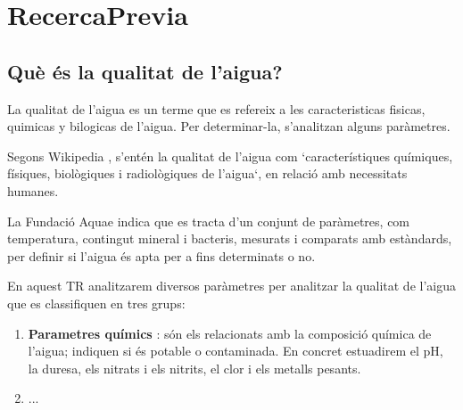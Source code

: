 \chapter{RecercaPrevia}
\label{c:RecercaPrevia}
\section{Què és la qualitat de l’aigua?}
La qualitat de l'aigua es un terme que es refereix a les caracteristicas fisicas, quimicas y bilogicas de l'aigua. Per determinar-la, s'analitzan alguns paràmetres.

Segons Wikipedia \cite{WikiAgua}, s'entén la qualitat de l'aigua com `característiques químiques, físiques, biològiques i radiològiques de l'aigua`, en relació amb necessitats humanes.

La Fundació Aquae \cite{Fundacionaquae} indica que es tracta d'un conjunt de paràmetres, com temperatura, contingut mineral i bacteris, mesurats i comparats amb estàndards, per definir si l'aigua és apta per a fins determinats o no.

En aquest TR analitzarem diversos paràmetres per analitzar la qualitat de l'aigua que es classifiquen en tres grups:
\begin{enumerate}
  \item \textbf{Parametres químics} : són els relacionats amb la composició química de l’aigua; indiquen si és potable o contaminada. En concret estuadirem el pH, la duresa, els nitrats i els nitrits, el clor i els metalls pesants.
  \item ...

\end{enumerate}

\clearpage

